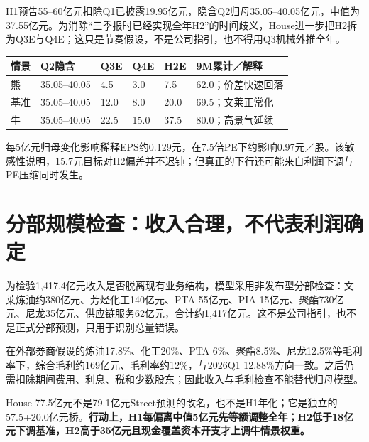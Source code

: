 H1预告55--60亿元扣除Q1已披露19.95亿元，隐含Q2归母35.05--40.05亿元，中值为37.55亿元。为消除“三季报时已经实现全年H2”的时间歧义，House进一步把H2拆为Q3E与Q4E；这只是节奏假设，不是公司指引，也不得用Q3机械外推全年。

\begin{exhibitbox}
\small
\noindent\begin{tabularx}{\textwidth}{L{2.2cm}R{1.7cm}R{1.7cm}R{1.7cm}R{1.8cm}X}
\toprule
\textbf{情景} & \textbf{Q2隐含} & \textbf{Q3E} & \textbf{Q4E} & \textbf{H2E} & \textbf{9M累计／解释} \\
\midrule
熊 & 35.05--40.05 & 4.5 & 3.0 & 7.5 & 62.0；价差快速回落 \\
基准 & 35.05--40.05 & 12.0 & 8.0 & 20.0 & 69.5；文莱正常化 \\
牛 & 35.05--40.05 & 22.5 & 15.0 & 37.5 & 80.0；高景气延续 \\
\bottomrule
\end{tabularx}
\end{exhibitbox}

每5亿元归母变化影响稀释EPS约0.129元，在7.5倍PE下约影响0.97元／股。该敏感性说明，15.7元目标对H2偏差并不迟钝；但真正的下行还可能来自利润下调与PE压缩同时发生。

\section{分部规模检查：收入合理，不代表利润确定}

为检验1,417.4亿元收入是否脱离现有业务结构，模型采用非发布型分部检查：文莱炼油约380亿元、芳烃化工140亿元、PTA 55亿元、PIA 15亿元、聚酯730亿元、尼龙35亿元、供应链服务62亿元，合计约1,417亿元。这不是公司指引，也不是正式分部预测，只用于识别总量错误。

在外部券商假设的炼油17.8\%、化工20\%、PTA 6\%、聚酯8.5\%、尼龙12.5\%等毛利率下，综合毛利约169亿元、毛利率约12\%，与2026Q1 12.88\%方向一致。之后仍需扣除期间费用、利息、税和少数股东；因此收入与毛利检查不能替代归母模型。

\begin{keyinsight}
House 77.5亿元不是79.1亿元Street预测的改名，也不是H1年化；它是独立的57.5+20.0亿元桥。\textbf{行动上，H1每偏离中值5亿元先等额调整全年；H2低于18亿元下调基准，H2高于35亿元且现金覆盖资本开支才上调牛情景权重。}
\end{keyinsight}

